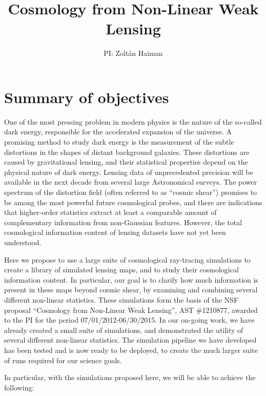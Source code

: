 \documentclass[10pt, preprint]{aastex}
\begin{document}


\title{Cosmology from Non-Linear Weak Lensing}

\author{PI: Zolt\'an Haiman}


\section{Summary of objectives} \label{sec:goals}

One of the most pressing problem in modern physics is the nature of
the so-called dark energy, responsible for the accelerated expansion
of the universe.  A promising method to study dark energy is the
measurement of the subtle distortions in the shapes of distant
background galaxies. These distortions are caused by gravitational
lensing, and their statistical properties depend on the physical
nature of dark energy.  Lensing data of unprecedented precision will
be available in the next decade from several large Astronomical
surveys.  The power spectrum of the distortion field (often referred
to as ``cosmic shear'') promises to be among the most powerful future
cosmological probes, and there are indications that higher-order
statistics extract at least a comparable amount of complementary
information from non-Gaussian features.  However, the total
cosmological information content of lensing datasets have not yet been
understood.

Here we propose to use a large suite of cosmological ray-tracing
simulations to create a library of simulated lensing maps, and to
study their cosmological information content.  In particular, our goal
is to clarify how much information is present in these maps beyond
cosmic shear, by examining and combining several different non-linear
statistics.  These simulations form the basis of the NSF proposal
``Cosmology from Non-Linear Weak Lensing'', AST \#1210877, awarded to
the PI for the period 07/01/2012-06/30/2015.  In our on-going work, we
have already created a small suite of simulations, and demonstrated
the utility of several different non-linear statistics.  The
simulation pipeline we have developed has been tested and is now ready
to be deployed, to create the much larger suite of runs required for
our science goals.

In particular, with the simulations proposed here, we will be able to
achieve the following:
\end{document}
